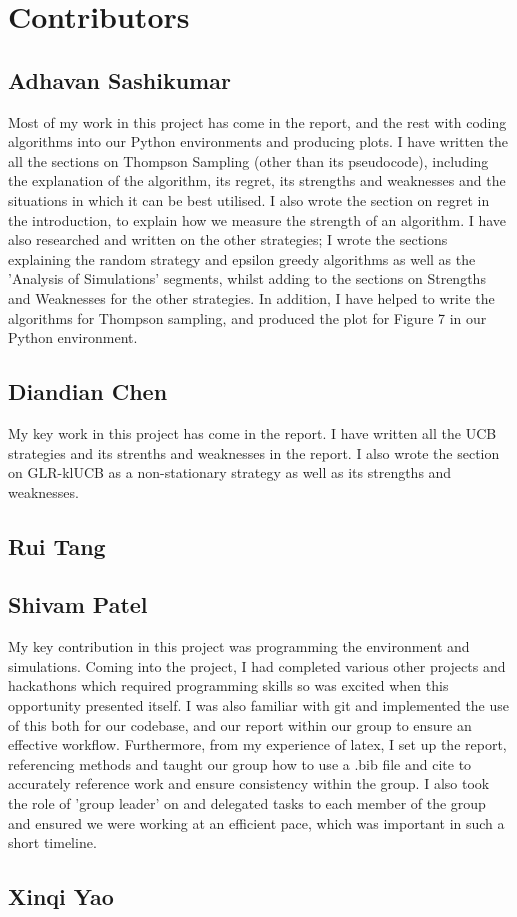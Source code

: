 \section{Contributors}\label{sec:contributors}

\subsection{Adhavan Sashikumar}\label{subsec:adhavan-sashikumar}
Most of my work in this project has come in the report, and the rest with coding algorithms into our Python environments and producing plots.
I have written the all the sections on Thompson Sampling (other than its pseudocode), including the explanation of the algorithm, its regret, its strengths and weaknesses and the situations in which it can be best utilised.
I also wrote the section on regret in the introduction, to explain how we measure the strength of an algorithm.
I have also researched and written on the other strategies;
I wrote the sections explaining the random strategy and epsilon greedy algorithms as well as the 'Analysis of Simulations' segments, whilst adding to the sections on Strengths and Weaknesses for the other strategies.
In addition, I have helped to write the algorithms for Thompson sampling, and produced the plot for Figure 7 in our Python environment.

\subsection{Diandian Chen}\label{subsec:diandian-chen}
My key work in this project has come in the report.
I have written all the UCB strategies and its strenths and weaknesses in the report.
I also wrote the section on GLR-klUCB as a non-stationary strategy as well as its strengths and weaknesses.

\subsection{Rui Tang}\label{subsec:rui-tang}

\subsection{Shivam Patel}\label{subsec:shivam-patel}
My key contribution in this project was programming the environment and simulations.
Coming into the project, I had completed various other projects and hackathons which required programming skills so was excited when this opportunity presented itself.
I was also familiar with git and implemented the use of this both for our codebase, and our report within our group to ensure an effective workflow.
Furthermore, from my experience of latex, I set up the report, referencing methods and taught our group how to use a .bib file and cite to accurately reference work and ensure consistency within the group.
I also took the role of 'group leader' on and delegated tasks to each member of the group and ensured we were working at an efficient pace, which was important in such a short timeline.

\subsection{Xinqi Yao}\label{subsec:xinqi-yao}
